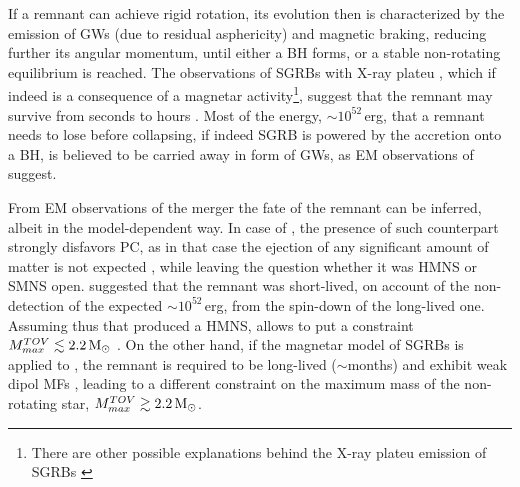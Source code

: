 If a remnant can achieve rigid rotation, its evolution then is characterized by the emission 
of \acp{GW} (due to residual asphericity) and magnetic braking, reducing further its 
angular momentum, until either a \ac{BH} forms, or a stable non-rotating equilibrium is reached.
The observations of \acp{SGRB} with X-ray plateu 
\citep{Zhang:2000wx,Lasky:2015lej,Fan:2013cra}, which if indeed is a consequence of 
a magnetar activity\footnote{
    There are other possible explanations behind the X-ray plateu emission of \acp{SGRB} 
    \citep{Oganesyan:2019jij}
}, suggest that the remnant may survive from seconds to hours \citep{Fan:2013cra,Ravi:2014gxa}.
Most of the energy, ${\sim}10^{52}\,$erg, that a remnant needs to lose before collapsing, if indeed \ac{SGRB} is powered by the accretion onto a \ac{BH}, 
is believed to be carried away in form of \acp{GW}, as \ac{EM} observations of \GW{} suggest.

From \ac{EM} observations of the merger the fate of the remnant can be inferred, 
albeit in the model-dependent way. 
In case of \GW{}, the presence of such counterpart 
strongly disfavors \ac{PC}, as in that case the ejection of any significant amount 
of matter is not expected \citep{Margalit:2017dij,Bauswein:2017vtn,Radice:2017lry}, while leaving 
the question whether it was \ac{HMNS} or \ac{SMNS} open. \citet{Margalit:2017dij} suggested 
that the remnant was short-lived, on account of the non-detection of the expected ${\sim}10^{52}\,$erg, 
from the spin-down of the long-lived one. Assuming thus that \GW{} produced a \ac{HMNS}, 
allows to put a constraint $M_{max}^{TOV} \lesssim 2.2\,{\text{M}_{\odot}}$ \citep{Margalit:2017dij}.
%
On the other hand, if the magnetar model of \acp{SGRB} is applied to \GW{} 
\citep{Ai:2018jtv,Li:2018hzy,Piro:2018bpl}, the remnant is required to be long-lived
(${\sim}$months) and exhibit weak dipol \acp{MF} \citep{Ai:2018jtv}, leading to a different 
constraint on the maximum mass of the non-rotating star, $M_{max}^{TOV} \gtrsim 2.2\,{\text{M}_{\odot}}$. 
 



